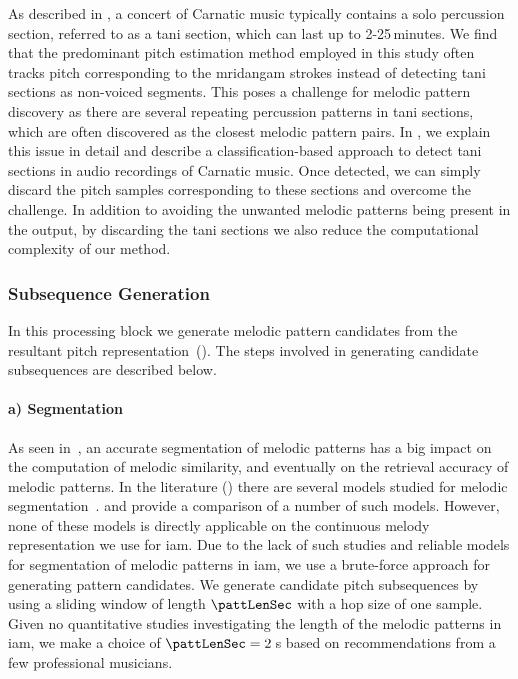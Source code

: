 As described in , a concert of Carnatic music typically contains a solo percussion section, referred to as a \gls{tani} section, which can last up to 2-25\,minutes. We find that the predominant pitch estimation method employed in this study often tracks pitch corresponding to the \gls{mridangam} strokes instead of detecting \gls{tani} sections as non-voiced segments. This poses a challenge for melodic pattern discovery as there are several repeating percussion patterns in \gls{tani} sections, which are often discovered as the closest melodic pattern pairs. In , we explain this issue in detail and describe a classification-based approach to detect \gls{tani} sections in audio recordings of Carnatic music. Once detected, we can simply discard the pitch samples corresponding to these sections and overcome the challenge. In addition to avoiding the unwanted melodic patterns being present in the output, by discarding the \gls{tani} sections we also reduce the computational complexity of our method.


\subsubsection{Subsequence Generation}
\label{sec:subsequencegeneration}

In this processing block we generate melodic pattern candidates from the resultant pitch representation~(). The steps involved in generating candidate subsequences are described below.

\paragraph{a) Segmentation} 

As seen in~, an accurate segmentation of melodic patterns has a big impact on the computation of melodic similarity, and eventually on the retrieval accuracy of melodic patterns. In the literature () there are several models studied for melodic segmentation~\citep{Cambouropoulos2006,muller2009robust,cambouropoulos2001local}. \cite{pearce2008comparison} and \cite{rodriguez2014comparing} provide a comparison of a number of such models. However, none of these models is directly applicable on the continuous melody representation we use for \gls{iam}. Due to the lack of such studies and reliable models for segmentation of melodic patterns in \gls{iam}, we use a brute-force approach for generating pattern candidates. We generate candidate pitch subsequences by using a sliding window of length $\pattLenSec$ with a hop size of one sample. Given no quantitative studies investigating the length of the melodic patterns in \gls{iam}, we make a choice of $\pattLenSec = 2$\,s based on recommendations from a few professional musicians.

